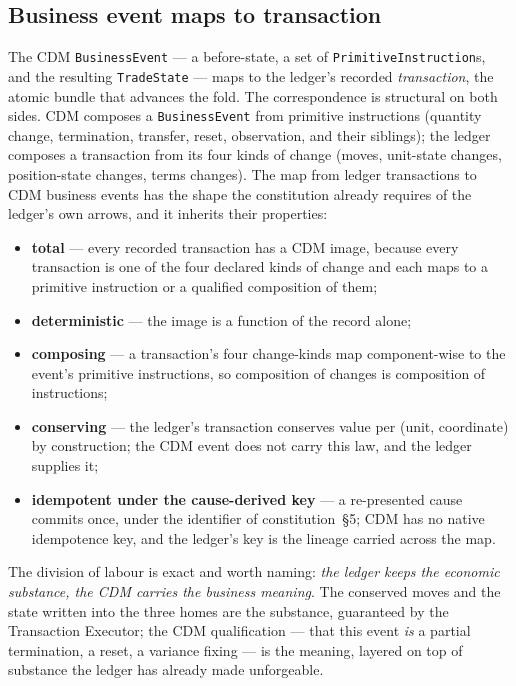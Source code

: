 \subsection{Business event maps to transaction}

The CDM \texttt{BusinessEvent} --- a before-state, a set of
\texttt{PrimitiveInstruction}s, and the resulting \texttt{TradeState} --- maps to
the ledger's recorded \emph{transaction}, the atomic bundle that advances the
fold. The correspondence is structural on both sides. CDM composes a
\texttt{BusinessEvent} from primitive instructions (quantity change,
termination, transfer, reset, observation, and their siblings); the ledger
composes a transaction from its four kinds of change (moves, unit-state changes,
position-state changes, terms changes). The map from ledger transactions to CDM
business events has the shape the constitution already requires of the ledger's
own arrows, and it inherits their properties:

\begin{itemize}[nosep,leftmargin=1.4em]
  \item \textbf{total} --- every recorded transaction has a CDM image, because
        every transaction is one of the four declared kinds of change and each
        maps to a primitive instruction or a qualified composition of them;
  \item \textbf{deterministic} --- the image is a function of the record alone;
  \item \textbf{composing} --- a transaction's four change-kinds map
        component-wise to the event's primitive instructions, so composition of
        changes is composition of instructions;
  \item \textbf{conserving} --- the ledger's transaction conserves value per
        (unit, coordinate) by construction; the CDM event does not carry this
        law, and the ledger supplies it;
  \item \textbf{idempotent under the cause-derived key} --- a re-presented cause
        commits once, under the identifier of constitution~\S5; CDM has no native
        idempotence key, and the ledger's key is the lineage carried across the
        map.
\end{itemize}

The division of labour is exact and worth naming: \emph{the ledger keeps the
economic substance, the CDM carries the business meaning}. The conserved moves
and the state written into the three homes are the substance, guaranteed by the
Transaction Executor; the CDM qualification --- that this event \emph{is} a
partial termination, a reset, a variance fixing --- is the meaning, layered on
top of substance the ledger has already made unforgeable.

